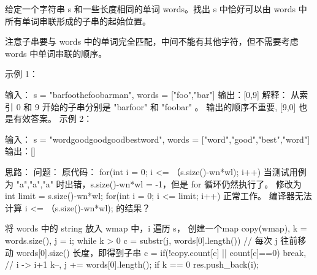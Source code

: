给定一个字符串 s 和一些长度相同的单词 words。找出 s 中恰好可以由 words 中所有单词串联形成的子串的起始位置。

注意子串要与 words 中的单词完全匹配，中间不能有其他字符，但不需要考虑 words 中单词串联的顺序。

 

示例 1：

输入：
  s = "barfoothefoobarman",
  words = ["foo","bar"]
输出：[0,9]
解释：
从索引 0 和 9 开始的子串分别是 "barfoor" 和 "foobar" 。
输出的顺序不重要, [9,0] 也是有效答案。
示例 2：

输入：
  s = "wordgoodgoodgoodbestword",
  words = ["word","good","best","word"]
输出：[]

































思路：
问题：
原代码：
for(int i = 0; i <= （s.size()-wn*wl); i++) 当测试用例为  "a",{"a","a"} 时出错，s.size()-wn*wl = -1，但是 for 循环仍然执行了。
修改为
int limit = s.size()-wn*wl;
for(int i = 0; i <= limit; i++)
正常工作。
编译器无法计算 i <= （s.size()-wn*wl); 的结果？


将 words 中的 string 放入 wmap 中，i 遍历 s，
创建一个map copy(wmap), k = words.size(), j = i;
while k > 0
c = substr(j, words[0].length())      // 每次 j 往前移动 words[0].size() 长度，即得到子串 c =
if(!copy.count[c] || count[c]==0) break, // i -> i+1
k--, j += words[0].length();
if k == 0 	res.push_back(i);






























